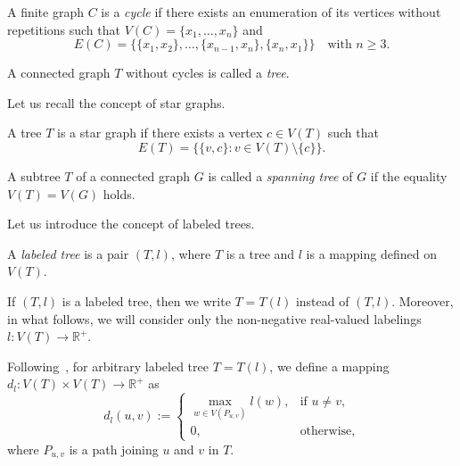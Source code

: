 \documentclass{article}
\begin{document}
A finite graph $C$ is a \textit{cycle} if there exists an enumeration of its vertices without repetitions such that $V(C) = \{x_1, \ldots, x_n\}$ and
\begin{equation*}
E(C) = \{\{x_1, x_2\}, \ldots, \{x_{n-1}, x_n\}, \{x_n, x_1\}\} \quad \text{with } n \geq 3.
\end{equation*}





\begin{Definition}
A connected graph $T$  without cycles is called a \textit{tree}. 
\end{Definition}


Let us recall the concept of star graphs.

\begin{Definition}\label{efhjc}
A tree $T$ is  a star graph if there exists a vertex
$c \in V(T)$ such that 
\begin{equation*}
E(T)=\{\{v,c\} \colon v\in V(T)\setminus \{c\}\}.
\end{equation*}
\end{Definition}



A subtree $T$ of a connected graph $G$ is called a \emph{spanning tree} of $G$ if the equality $V(T)=V(G)$ holds.








Let us introduce the concept of labeled trees.

\begin{Definition}\label{d2.4}
A {\it labeled tree} is a pair \((T, l)\), where \(T\) is a tree and \(l\) is a mapping defined on \(V(T)\).
\end{Definition}




If $(T,l)$ is a labeled tree, then we  write \(T = T(l)\) instead of \((T, l)\). Moreover, in what follows, we will consider only the non-negative real-valued labelings \(l\colon V(T)\to \mathbb R^{+}\).




Following~\cite{Dov2020TaAoG}, for arbitrary labeled tree \(T = T(l)\), we define a mapping \(d_l \colon V(T) \times V(T) \to \mathbb R^{+}\) as
\begin{equation}\label{e11.3}
d_l(u, v) := \begin{cases}
\max\limits_{w \in V(P_{u,v})} l(w), & \text{if} \,\,u \neq v,\\
0 ,& \text{otherwise},
\end{cases}
\end{equation}
where \(P_{u,v}\) is a path joining \(u\) and \(v\) in \(T\).
 
\end{document}
